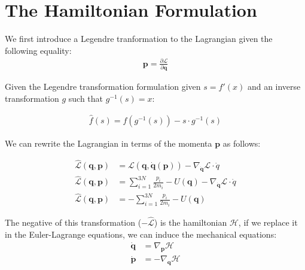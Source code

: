 \documentclass[draft]{agujournal2019}
\begin{document}
\section{The Hamiltonian Formulation}
We first introduce a Legendre tranformation to the Lagrangian given the following equality:
\begin{align*}
    \mathbf{p} = \frac{\partial \mathcal{L}}{\partial \mathbf{q}}
\end{align*}

Given the Legendre transformation formulation given $s = f'(x)$ and an inverse transformation $g$ such that $g^{-1}(s) = x$:

\begin{align*}
    \hat{f}(s) = f(g^{-1}(s)) - s \cdot g^{-1}(s)
\end{align*}

We can rewrite the Lagrangian in terms of the momenta $\mathbf{p}$ as follows:

\begin{align*}
    \hat{\mathcal{L}}(\mathbf{q}, \mathbf{p}) &= \mathcal{L}(\mathbf{q}, \dot{\mathbf{q}}(\mathbf{p})) - \nabla_{\dot{\mathbf{q}}} \mathcal{L} \cdot \dot{q} \\
    \hat{\mathcal{L}}(\mathbf{q}, \mathbf{p}) &= \sum_{i = 1}^{3N} \frac{p_i}{2m_i} - U(\mathbf{q}) - \nabla_{\dot{\mathbf{q}}} \mathcal{L} \cdot \dot{q} \\
    \hat{\mathcal{L}}(\mathbf{q}, \mathbf{p}) &= - \sum_{i = 1}^{3N} \frac{p_i}{2m_i} - U(\mathbf{q})
\end{align*}

The negative of this transformation ($-\hat{\mathcal{L}}$) is the hamiltonian $\mathcal{H}$, if we replace it in the Euler-Lagrange equations, we can induce the mechanical equations:
\begin{align*}
    \dot{\mathbf{q}} &= \nabla_\mathbf{p} \mathcal{H} \\
    \dot{\mathbf{p}} &= - \nabla_\mathbf{q} \mathcal{H} \\
\end{align*}
\end{document}
